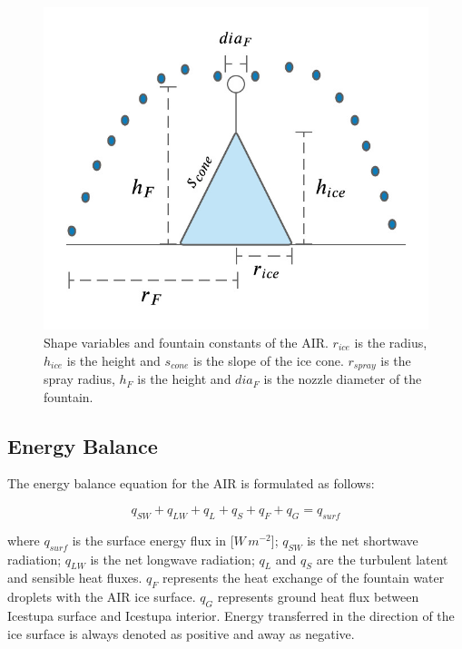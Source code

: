 \documentclass[utf8]{frontiersSCNS} %
\begin{document}
    \begin{figure} \begin{center} \includegraphics[width=10
cm]{Figures/Figure_5.jpg} \end{center} \caption{Shape variables and fountain constants of the AIR. $r_{ice}$ is
the radius, $h_{ice}$ is the height and $s_{cone}$ is the slope of the ice cone. $r_{spray}$ is the spray radius, $h_F$ is the
height and $dia_F$ is the nozzle diameter of the fountain.} \label{fig:shape} \end{figure}

\subsection{Energy Balance} \label{section:EB}

The energy balance equation \citep{Hock_2005} for the AIR is formulated as follows:

\begin{equation} q_{SW} + q_{LW} + q_{L} + q_{S} + q_{F} + q_{G} = q_{surf} \label{eqn:EB} \end{equation}

where $q_{surf}$ is the surface energy flux in [$W\,m^{-2}$]; $q_{SW}$ is the net shortwave radiation; $q_{LW}$ is the
net longwave radiation; $q_{L}$ and $q_{S}$ are the turbulent latent and sensible heat fluxes. $q_{F}$ represents the heat
exchange of the fountain water droplets with the AIR ice surface. $q_{G}$ represents ground heat flux between Icestupa
surface and Icestupa interior. Energy transferred in the direction of the ice surface is always denoted as positive and
away as negative.  
\end{document}
